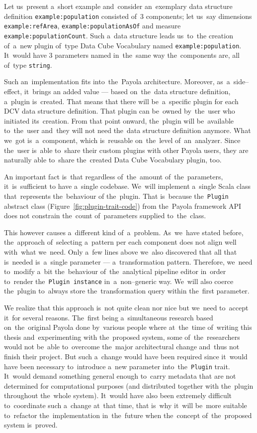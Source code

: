 \begin{sloppypar}
Let us~present a~short example and~consider an~exemplary data structure definition \texttt{example:population}
consisted of~3 
components; let us~say dimensions \texttt{example:refArea}, \texttt{example:populationAsOf}
and measure \texttt{example:populationCount}. Such a~data structure leads us~to~the creation of~a~new plugin of~type Data Cube Vocabulary named 
\texttt{example:population}. It~would have 3 parameters named in~the~same way the~components are, all of~type \texttt{string}.
\end{sloppypar}

Such an~implementation fits into~the~Payola architecture. Moreover, as~a~side--effect, it~brings
an added value --- based on~the~data structure definition, a~plugin is~created. 
That means that there will be~a~specific plugin for each DCV data structure 
definition. That plugin can be~owned by~the~user who initiated its~creation. 
From that point onward, the~plugin will be~available to~the~user and~they
will not need the~data structure definition anymore. What we~got is~a~component, which is~reusable on~the~level of~an~analyzer. Since the~user is~able to~share their custom plugins with other Payola users, they are
naturally able to~share the~created Data Cube Vocabulary plugin, too. 

An important fact is~that regardless of~the~amount of~the~parameters, it~is~sufficient 
to have a~single codebase. We~will implement a~single Scala class that~represents the~behaviour 
of the~plugin. That is~because the~\texttt{Plugin} abstract class (Figure~\ref{fig:plugin-trait-code})
from the~Payola framework
API does not constrain the~count of~parameters supplied to~the~class.

This however causes a~different kind of~a~problem. As~we~have stated before, the~approach of~selecting a~pattern per each component does not align well
with~what we~need. Only a~few lines above we~also discovered that all that is~needed is~a~single parameter --- a~transformation pattern. Therefore, we~need to~modify a~bit the~behaviour of~the~analytical pipeline editor in~order to~render the~\texttt{Plugin instance}
in~a~non--generic way. We~will also coerce the~plugin to~always store the~transformation query 
within the~first parameter.

We realize that this approach is~not quite clean nor nice but we~need to~accept it~for several reasons.
The~first being a~simultaneous research based on~the~original Payola done by~various people where
at~the~time of~writing this thesis and~experimenting with the~proposed system, some of~the~researchers 
would not be~able to~overcome the~major architectural change and~thus not finish their project.
But such a~change would have been required since 
it~would have been necessary to~introduce a~new parameter into~the~\texttt{Plugin} trait. 
It~would demand something general enough to~carry metadata that are not determined for 
computational purposes (and distributed together with the~plugin throughout the~whole system).
It~would have also been extremely difficult to~coordinate such 
a~change at~that time, that is~why it~will be~more suitable to~refactor the~implementation in~the~future when the~concept of~the~proposed system is~proved.

